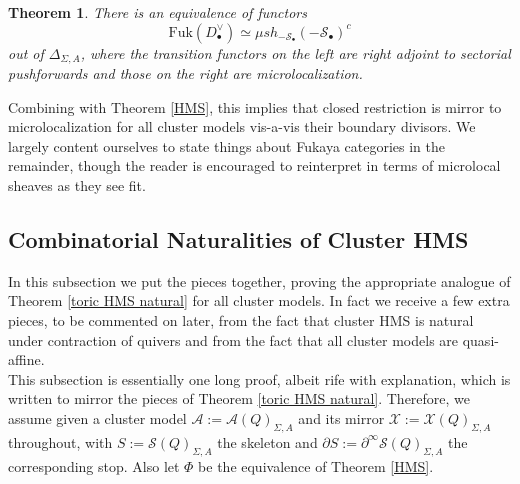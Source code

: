 \documentclass[11pt]{amsart}
\newtheorem{thm}{Theorem}[section]
\theoremstyle{definition}
\theoremstyle{remark}
\newcommand{\A}{\mathcal{A}}
\newcommand{\X}{\mathcal{X}}
\newcommand{\Fuk}{\mathrm{Fuk}}
\numberwithin{equation}{section}
\begin{document}
\begin{thm}\label{microlocal}
        There is an equivalence of functors $$\Fuk(D_\bullet^\vee) \simeq \mu sh_{-\mathcal{S}_\bullet}(-\mathcal{S}_\bullet)^c$$ \noindent out of $\Delta_{\Sigma, A}$, where the transition functors on the left are right adjoint to sectorial pushforwards and those on the right are microlocalization.
    \end{thm}

    Combining with Theorem \ref{HMS}, this implies that closed restriction is mirror to microlocalization for all cluster models vis-a-vis their boundary divisors. We largely content ourselves to state things about Fukaya categories in the remainder, though the reader is encouraged to reinterpret in terms of microlocal sheaves as they see fit.

    \subsection{Combinatorial Naturalities of Cluster HMS} In this subsection we put the pieces together, proving the appropriate analogue of Theorem \ref{toric HMS natural} for all cluster models. In fact we receive a few extra pieces, to be commented on later, from the fact that cluster HMS is natural under contraction of quivers and from the fact that all cluster models are quasi-affine.\\

    This subsection is essentially one long proof, albeit rife with explanation, which is written to mirror the pieces of Theorem \ref{toric HMS natural}. Therefore, we assume given a cluster model $\A:= \mathcal{A}(Q)_{\Sigma, A}$ and its mirror $\X := \mathcal{X}(Q)_{\Sigma, A}$ throughout, with $S := \mathcal{S}(Q)_{\Sigma, A}$ the skeleton and $\partial S := \partial^\infty \mathcal{S}(Q)_{\Sigma, A}$ the corresponding stop. Also let $\Phi$ be the equivalence of Theorem \ref{HMS}.\\
\end{document}
